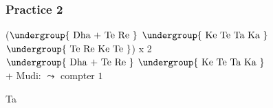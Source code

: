 \documentclass[12pt]{article}
\def\kihai{kihai}
\newcommand{\matra}[1]{$\undergroup{\text{#1}}$}
\newif\ifdoigt
\newcommand{\bol}[2]{%
  \ifdoigt
  \pbox[b]{2cm}
       {\hspace*{\fill}{\scriptsize #2}\\#1}
  \else
      {#1}
  \fi
}%
\def\K{\bol{Ke}{}}
\def\Ka{\bol{Ka}{}}
\def\Ro{\bol{Re}{gn1}}
\def\Tt{\bol{Te}{g3}}
\def\Ta{\bol{Ta}{g3}}
\def\N{\bol{Na}{k}}
\def\Tu{\bol{Tun}{sn1}}
\def\Da{\bol{Dha}{k/2}}
\def\Ka{\bol{Ka}{}}
\def\sep{ / }
\def\sepnl{\\}
\newcommand{\double}[1]{%
  #1\bol{+}{}
  }%
\begin{document}




\subsubsection*{Practice 2}
(\matra{\double{\Da}  \Tt \Ro} \matra{\K \Tt \Ta \Ka} \matra{\Tt \Ro \K \Tt}) x 2 \sepnl
\matra{\double{\Da} \Tt \Ro} \matra{\K \Tt \Ta \Ka} \sepnl
+ Mudi: $\leadsto$ compter $1$ \Ta



\end{document}
